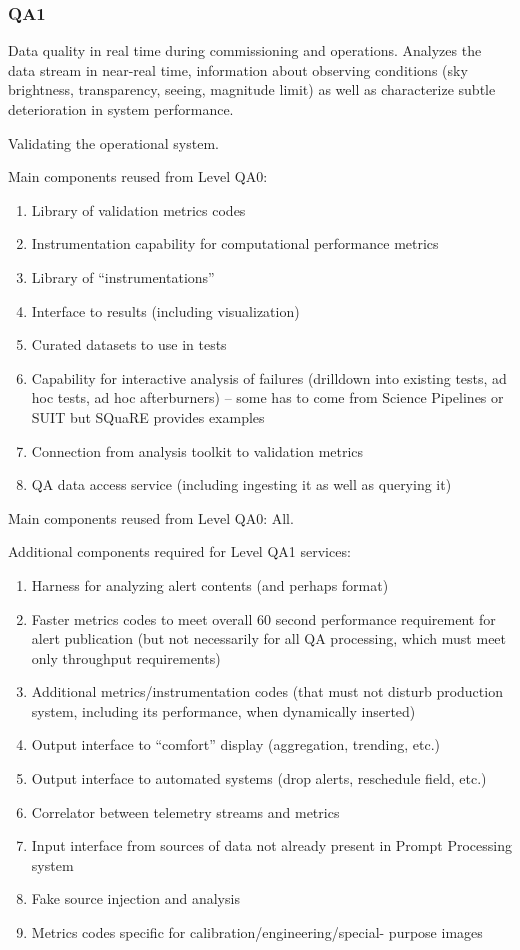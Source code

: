 \subsubsection{QA1}
Data quality in real time during commissioning and operations. Analyzes the data stream in near-real time, information about observing conditions (sky brightness, transparency, seeing, magnitude limit) as well as characterize subtle deterioration in system performance.

Validating the operational system.

Main components reused from Level QA0:
\begin{enumerate}
\item Library of validation metrics codes
\item Instrumentation capability for computational performance metrics
\item Library of “instrumentations”
\item Interface to results (including visualization)
\item Curated datasets to use in tests
\item Capability for interactive analysis of failures (drilldown into existing tests, ad hoc tests, ad hoc afterburners) – some has to come from Science Pipelines or SUIT but SQuaRE provides examples
\item Connection from analysis toolkit to validation metrics
\item QA data access service (including ingesting it as well as querying it)
\end{enumerate}

Main components reused from Level QA0: All.

Additional components required for Level QA1 services:

\begin{enumerate}
\item Harness for analyzing alert contents (and perhaps format)
\item Faster metrics codes to meet overall 60 second performance requirement for alert publication (but not necessarily for all QA processing, which must meet only throughput requirements)
\item Additional metrics/instrumentation codes (that must not disturb production system, including its performance, when dynamically inserted)
\item Output interface to “comfort” display (aggregation, trending, etc.)
\item Output interface to automated systems (drop alerts, reschedule field, etc.)
\item Correlator between telemetry streams and metrics
\item Input interface from sources of data not already present in Prompt Processing system
\item Fake source injection and analysis
\item Metrics codes specific for calibration/engineering/special- purpose images
\end{enumerate}

